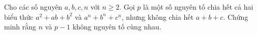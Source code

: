 \ifshowproblem
\begin{problem}\label{example:FRA-2015-TST1-P7}
    Cho các số nguyên $a, b, c, n$ với $n \geq 2$.
    Gọi $p$ là một số nguyên tố chia hết cả hai biểu thức $a^2 + ab + b^2$ và $a^n + b^n + c^n$, nhưng không chia hết $a + b + c$.  
    Chứng minh rằng $n$ và $p - 1$ không nguyên tố cùng nhau.
\end{problem}
\fi

\footnotemark
{}
\fi